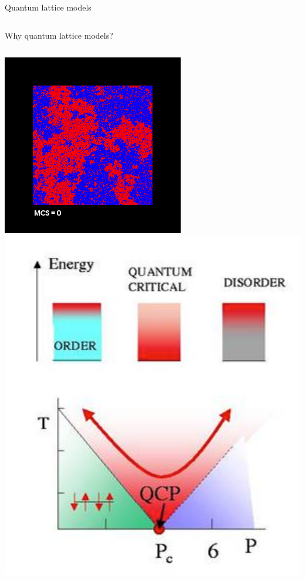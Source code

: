 \begin{frame}[fragile]{Quantum lattice models}
\begin{columns}[T]
\begin{column}{.2\textwidth}
    \end{column}
  \end{columns}
\end{frame}

\begin{frame}[t,fragile]{Why quantum lattice models?}
  \begin{columns}[T]
    \begin{column}{.2\textwidth}
      \includegraphics[width=\textwidth]{ising-tc.png} \\
      \includegraphics[width=\textwidth]{qcp.pdf}

\end{column}
\end{columns}
\end{frame}

